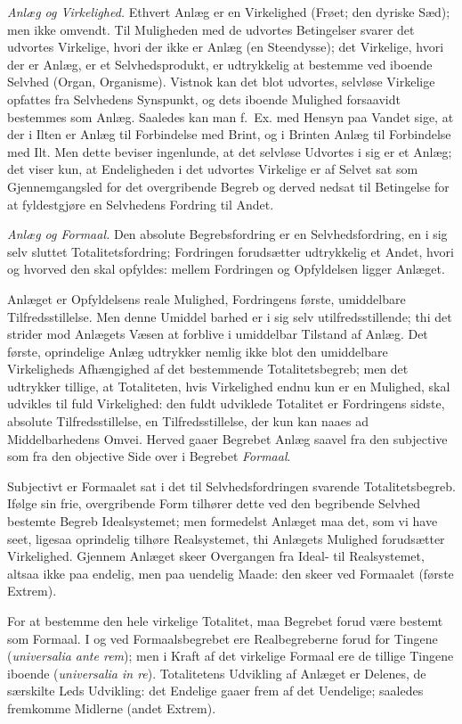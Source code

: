 \documentclass[12pt]{book}
\newcommand{\opage}[1]{\marginnote{\footnotesize\textit{[#1]}}}
\begin{document}
\emph{Anlæg og Virkelighed.} Ethvert Anlæg er en
Virkelighed (Frøet; den dyriske Sæd); men ikke omvendt. Til
Muligheden med de udvortes Betingelser svarer det udvortes
Virkelige, hvori der ikke er Anlæg (en Steendysse); det
Virkelige, hvori der er Anlæg, er et Selvhedsprodukt, er
udtrykkelig at bestemme ved iboende Selvhed (Organ,
Organisme). Vistnok kan det blot udvortes, selvløse Virkelige
opfattes fra Selvhedens Synspunkt, og dets iboende
Mulighed forsaavidt bestemmes som Anlæg. Saaledes kan man
f.~Ex. med Hensyn paa Vandet sige, at der i Ilten er
Anlæg til Forbindelse med Brint, og i Brinten Anlæg til
Forbindelse med Ilt. Men dette beviser ingenlunde, at det
selvløse Udvortes i sig er et Anlæg; det viser kun, at
Endeligheden i det udvortes Virkelige er af Selvet sat som
Gjennemgangsled for det overgribende Begreb og derved
nedsat til Betingelse for at fyldestgjøre en Selvhedens
Fordring til Andet.

\emph{Anlæg og Formaal.} Den absolute Begrebsfordring
er en Selvhedsfordring, en i sig selv sluttet
Totalitetsfordring; Fordringen forudsætter udtrykkelig et Andet, hvori og
hvorved den skal opfyldes: mellem Fordringen og Opfyldelsen
ligger Anlæget.

Anlæget er Opfyldelsens reale Mulighed, Fordringens
første, umiddelbare Tilfredsstillelse. Men denne Umiddel\-%
\opage{47}barhed er i sig selv utilfredsstillende; thi det strider mod
Anlægets Væsen at forblive i umiddelbar Tilstand af Anlæg.
Det første, oprindelige Anlæg udtrykker nemlig ikke blot den
umiddelbare Virkeligheds Afhængighed af det bestemmende
Totalitetsbegreb; men det udtrykker tillige, at Totaliteten,
hvis Virkelighed endnu kun er en Mulighed, skal udvikles
til fuld Virkelighed: den fuldt udviklede Totalitet er
Fordringens sidste, absolute Tilfredsstillelse, en Tilfredsstillelse,
der kun kan naaes ad Middelbarhedens Omvei. Herved
gaaer Begrebet Anlæg saavel fra den subjective som fra den
objective Side over i Begrebet \emph{Formaal}.

Subjectivt er Formaalet sat i det til Selvhedsfordringen
svarende Totalitetsbegreb. Ifølge sin frie, overgribende Form
tilhører dette ved den begribende Selvhed bestemte Begreb
Idealsystemet; men formedelst Anlæget maa det, som vi have
seet, ligesaa oprindelig tilhøre Realsystemet, thi Anlægets
Mulighed forudsætter Virkelighed. Gjennem Anlæget skeer
Overgangen fra Ideal- til Realsystemet, altsaa ikke paa
endelig, men paa uendelig Maade: den skeer ved Formaalet
(første Extrem).

For at bestemme den hele virkelige Totalitet, maa
Begrebet forud være bestemt som Formaal. I og ved
Formaalsbegrebet ere Realbegreberne forud for Tingene
(\textit{universalia ante rem}); men i Kraft af det virkelige Formaal
ere de tillige Tingene iboende (\textit{universalia in re}).
Totalitetens Udvikling af Anlæget er Delenes, de særskilte Leds
Udvikling: det Endelige gaaer frem af det Uendelige;
saaledes fremkomme Midlerne (andet Extrem).
\end{document}
